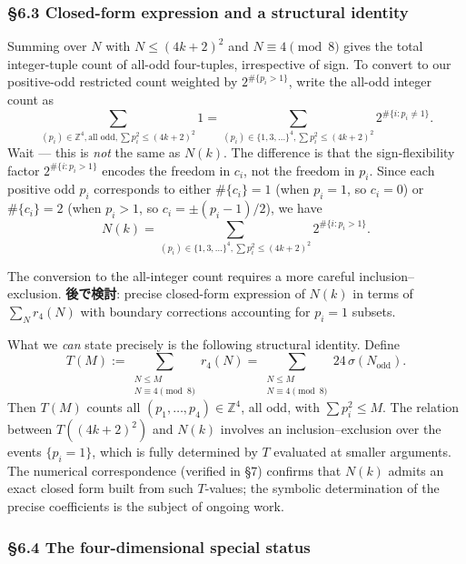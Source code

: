 \documentclass[a4paper,11pt]{article}
\theoremstyle{definition}
\begin{document}
\subsubsection{§6.3 Closed-form expression and a structural
identity}\label{closed-form-expression-and-a-structural-identity}

Summing over \(N\) with \(N \le (4k+2)^2\) and \(N \equiv 4 \pmod 8\)
gives the total integer-tuple count of all-odd four-tuples, irrespective
of sign. To convert to our positive-odd restricted count weighted by
\(2^{\#\{p_i > 1\}}\), write the all-odd integer count as
\[\sum_{(p_i) \in \mathbb{Z}^4, \text{all odd}, \sum p_i^2 \le (4k+2)^2} 1 = \sum_{(p_i) \in \{1,3,...\}^4, \sum p_i^2 \le (4k+2)^2} 2^{\#\{i : p_i \neq 1\}}.\]
Wait --- this is \emph{not} the same as \(N(k)\). The difference is that
the sign-flexibility factor \(2^{\#\{i : p_i > 1\}}\) encodes the
freedom in \(c_i\), not the freedom in \(p_i\). Since each positive odd
\(p_i\) corresponds to either \(\#\{c_i\} = 1\) (when \(p_i = 1\), so
\(c_i = 0\)) or \(\#\{c_i\} = 2\) (when \(p_i > 1\), so
\(c_i = \pm(p_i-1)/2\)), we have
\[N(k) = \sum_{(p_i) \in \{1,3,...\}^4, \sum p_i^2 \le (4k+2)^2} 2^{\#\{i : p_i > 1\}}.\]

The conversion to the all-integer count requires a more careful
inclusion--exclusion. \textbf{後で検討}: precise closed-form expression
of \(N(k)\) in terms of \(\sum_N r_4(N)\) with boundary corrections
accounting for \(p_i = 1\) subsets.

What we \emph{can} state precisely is the following structural identity.
Define
\[T(M) := \sum_{\substack{N \le M \\ N \equiv 4 \pmod 8}} r_4(N) = \sum_{\substack{N \le M \\ N \equiv 4 \pmod 8}} 24\,\sigma(N_{\mathrm{odd}}).\]
Then \(T(M)\) counts all \((p_1, \ldots, p_4) \in \mathbb{Z}^4\), all
odd, with \(\sum p_i^2 \le M\). The relation between \(T((4k+2)^2)\) and
\(N(k)\) involves an inclusion--exclusion over the events
\(\{p_i = 1\}\), which is fully determined by \(T\) evaluated at smaller
arguments. The numerical correspondence (verified in §7) confirms that
\(N(k)\) admits an exact closed form built from such \(T\)-values; the
symbolic determination of the precise coefficients is the subject of
ongoing work.

\subsubsection{§6.4 The four-dimensional special
status}\label{the-four-dimensional-special-status}
\end{document}
